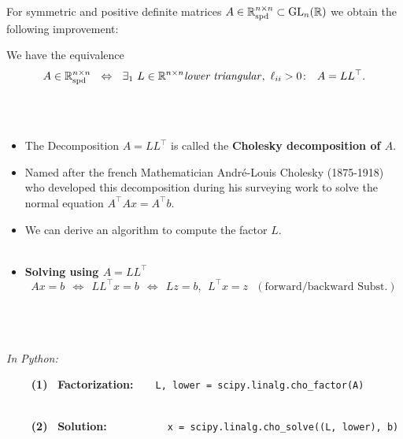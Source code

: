 \begin{frame}
	For symmetric and positive definite matrices $A\in {\mathbb{R}}^{n\times n}_{\text{spd}}\subset \text{GL}_n({\mathbb{R}})$ we obtain the following improvement:
	\begin{theorem}
		We have the equivalence
		$$A\in {\mathbb{R}}^{n\times n}_{\text{spd}} ~~\Leftrightarrow~~\exists_1~ L \in {\mathbb{R}}^{n\times n} \text{\emph{lower triangular}},~\ell_{ii}>0\colon~~ A = LL^\top.$$
	\end{theorem}
%	
~\\~\\
\begin{itemize}
	\item The Decomposition $A = LL^\top$ is called the \textbf{\color{defgruen} Cholesky decomposition of $A$}.
	\item Named after the french Mathematician André-Louis Cholesky (1875-1918) who developed this decomposition during his surveying work to solve the normal equation $A^\top A x = A^\top b$.
	\item We can derive an algorithm to compute the factor $L$.
	~\\~\\
	\item \textbf{Solving using $A=LL^\top$}\\
	$$Ax = b ~~\Leftrightarrow~~ LL^\top x = b ~~\Leftrightarrow~~ Lz = b,~~L^\top x = z~~~(\text{forward/backward Subst.})$$
\end{itemize}	
~\\~\\~\\
	\textit{In Python:}
	\begin{itemize}
		\item[{\bf~(1)}] {\bf~Factorization:}~~~~{\tt L, lower = scipy.linalg.cho\_factor(A)}~\\~\\
		\vspace{0.2cm}
		\item[{\bf~(2)}] {\bf~Solution:}~~~~~~~~~~~{\tt x = scipy.linalg.cho\_solve((L, lower), b)}
	\end{itemize}
\end{frame}
 
